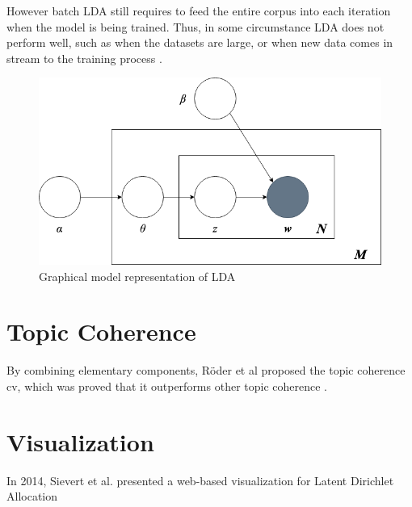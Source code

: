 \documentclass{article} %
\begin{document}
    However batch LDA still requires to feed the entire corpus into each iteration when the model is being trained. Thus, in some circumstance LDA does not perform well, such as when the datasets are large, or when new data comes in stream to the training process \cite{hoffman_online_2010}.
    \begin{figure}[H]
        \graphicspath{ {images/} }
        \begin{center}
            \includegraphics[scale=0.4]{LDA.png}
        \end{center}
        \caption{Graphical model representation of LDA}
    \end{figure}

    \section{Topic Coherence}
    By combining elementary components, Röder et al proposed the topic coherence c\textunderscore{}v, which was proved that it outperforms other topic coherence \cite{roder_exploring_2015}.

    \section{Visualization}
    In 2014, Sievert et al. presented a web-based visualization for Latent Dirichlet Allocation \cite{sievert_ldavis:_2014}


\end{document}
